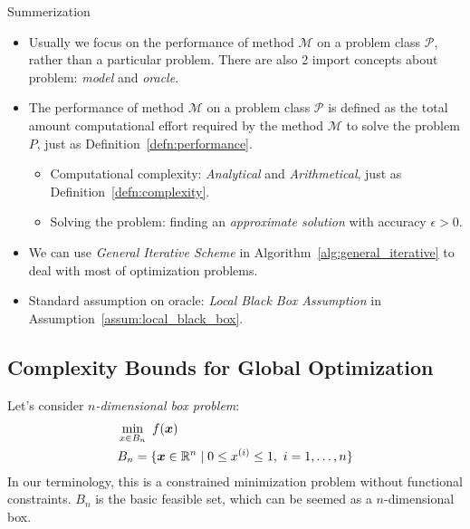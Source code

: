 \begin{boxnote}{Summerization}
    \begin{itemize}
        \item Usually we focus on the performance of method \(\mathscr{M}\) on a problem class \(\mathscr{P}\), rather than a particular problem. There are also 2 import concepts about problem: \emph{model} and \emph{oracle}.
        \item The performance of method \(\mathscr{M}\) on a problem class \(\mathscr{P}\) is defined as the total amount computational effort required by the method \(\mathscr{M}\) to solve the problem \(P\), just as Definition~\ref{defn:performance}.
              \begin{itemize}
                \item Computational complexity: \emph{Analytical} and \emph{Arithmetical}, just as Definition~\ref{defn:complexity}.
                \item Solving the problem: finding an \emph{approximate solution} with accuracy \(\epsilon > 0\).
              \end{itemize}
        \item We can use \emph{General Iterative Scheme} in Algorithm~\ref{alg:general_iterative} to deal with most of optimization problems.
        \item Standard assumption on oracle: \emph{Local Black Box Assumption} in Assumption~\ref{assum:local_black_box}.
    \end{itemize}
\end{boxnote}

\subsection{Complexity Bounds for Global Optimization}\label{subsec:Complexity_Bounds_for_Global_Optimization}

Let's consider \emph{\(n\)-dimensional box problem}:
\begin{equation}\label{eq:n_dimensional_box}
    \begin{aligned}
        & \min_{x \in B_n} ~ f(\bm{x}) \\
        & B_n = \{ \bm{x} \in \mathbb{R}^n \mid 0 \le {x}^{(i)} \le 1, ~ i = 1, \dots, n \}
    \end{aligned}
\end{equation}
In our terminology, this is a constrained minimization problem without functional constraints. \(B_n\) is the basic feasible set, which can be seemed as a \(n\)-dimensional box.

